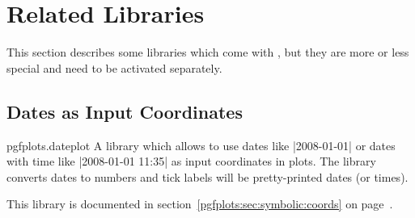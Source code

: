 \section{Related Libraries}
This section describes some libraries which come with \PGFPlots, but they are more or less special and need to be activated separately.

\subsection{Dates as Input Coordinates}
\begin{tikzlibrary}{pgfplots.dateplot}
	A library which allows to use dates like |2008-01-01| or dates with time like |2008-01-01 11:35| as input coordinates in plots. The library converts dates to numbers and tick labels will be pretty-printed dates (or times).

	This library is documented in section~\ref{pgfplots:sec:symbolic:coords} on page~\pageref{pgfplots:sec:date:coords}.
\end{tikzlibrary}

